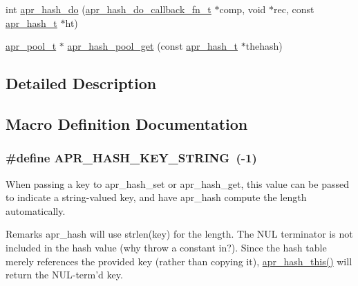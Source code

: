 \begin{DoxyCompactItemize}
\item 
int \hyperlink{group__apr__hash_ga3f3bac64e281d9e7eb9fed6101031394}{apr\-\_\-hash\-\_\-do} (\hyperlink{group__apr__hash_ga31696b2d87fbc5b626887a59f5ebb7d1}{apr\-\_\-hash\-\_\-do\-\_\-callback\-\_\-fn\-\_\-t} $\ast$comp, void $\ast$rec, const \hyperlink{group__apr__hash_ga72ec09b8bde6d874c36bd49df915fff6}{apr\-\_\-hash\-\_\-t} $\ast$ht)
\item 
\hyperlink{group__apr__pools_gaf137f28edcf9a086cd6bc36c20d7cdfb}{apr\-\_\-pool\-\_\-t} $\ast$ \hyperlink{group__apr__hash_ga6c170fee4d679928d381cd61c559c105}{apr\-\_\-hash\-\_\-pool\-\_\-get} (const \hyperlink{group__apr__hash_ga72ec09b8bde6d874c36bd49df915fff6}{apr\-\_\-hash\-\_\-t} $\ast$thehash)
\end{DoxyCompactItemize}


\subsection{Detailed Description}


\subsection{Macro Definition Documentation}
\hypertarget{group__apr__hash_ga3ba32541f2717b394000f87f38c7e12d}{
\subsubsection[{A\-P\-R\-\_\-\-H\-A\-S\-H\-\_\-\-K\-E\-Y\-\_\-\-S\-T\-R\-I\-N\-G}]{\setlength{\rightskip}{0pt plus 5cm}\#define A\-P\-R\-\_\-\-H\-A\-S\-H\-\_\-\-K\-E\-Y\-\_\-\-S\-T\-R\-I\-N\-G~(-\/1)}}\label{group__apr__hash_ga3ba32541f2717b394000f87f38c7e12d}
When passing a key to apr\-\_\-hash\-\_\-set or apr\-\_\-hash\-\_\-get, this value can be passed to indicate a string-\/valued key, and have apr\-\_\-hash compute the length automatically.

\begin{DoxyRemark}{Remarks}
apr\-\_\-hash will use strlen(key) for the length. The N\-U\-L terminator is not included in the hash value (why throw a constant in?). Since the hash table merely references the provided key (rather than copying it), \hyperlink{group__apr__hash_gad90e5b895397c2c535e32b3e44a75b3f}{apr\-\_\-hash\-\_\-this()} will return the N\-U\-L-\/term'd key. 
\end{DoxyRemark}


